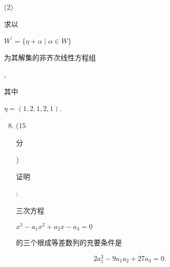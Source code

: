 \documentclass[10pt]{article}
\begin{document}
(2) \begin{CJK}{UTF8}{mj}求以\end{CJK} $W^{\prime}=\{\eta+\alpha \mid \alpha \in W\}$ \begin{CJK}{UTF8}{mj}为其解集的非齐次线性方程组\end{CJK}, \begin{CJK}{UTF8}{mj}其中\end{CJK} $\eta=(1,2,1,2,1)$.

\begin{enumerate}
  \setcounter{enumi}{7}
  \item (15 \begin{CJK}{UTF8}{mj}分\end{CJK}) \begin{CJK}{UTF8}{mj}证明\end{CJK}: \begin{CJK}{UTF8}{mj}三次方程\end{CJK} $x^{3}-a_{1} x^{2}+a_{2} x-a_{3}=0$ \begin{CJK}{UTF8}{mj}的三个根成等差数列的充要条件是\end{CJK}
\end{enumerate}
$$
2 a_{1}^{3}-9 a_{1} a_{2}+27 a_{3}=0 \text {. }
$$
\end{document}
